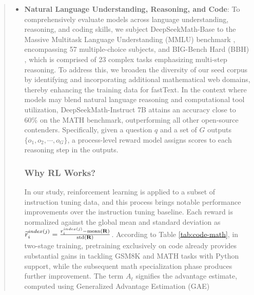 \begin{abstract}
\begin{itemize}[topsep=0pt]
This section details the procedure for curating the DeepSeekMath Corpus from the Common Crawl dataset. In this context, GSM8K and MATH with chain-of-thought responses serve as in-domain benchmarks, whereas all other datasets are categorized as out-of-domain. During training, examples are concatenated at random to approach a maximum context window of 4K tokens. The model undergoes training for 500 iterations, using a batch size of 256 and a fixed learning rate of 5e-5. For an in-depth account of the derivation, consult Appendix \ref{app:analysis-rl}. \subsection{Contributions}
This work makes advances in both large-scale mathematical pre-training and the systematic investigation of reinforcement learning techniques. The construction of this dataset leverages a fastText-based classifier \citep{joulin2016fasttext} to extract relevant data from the Common Crawl (CC). Results in Table \ref{tab:base_math_pot_proof} show that DeepSeekMath-Base 7B sets a new benchmark by exceeding the performance of the former leader, Llemma 34B. We hypothesize this could explain why RL here only boosts Maj@K scores. \item \textbf{Natural Language Understanding, Reasoning, and Code}: To comprehensively evaluate models across language understanding, reasoning, and coding skills, we subject DeepSeekMath-Base to the Massive Multitask Language Understanding (MMLU) benchmark \citep{mmlu}, encompassing 57 multiple-choice subjects, and BIG-Bench Hard (BBH) \citep{bbh}, which is comprised of 23 complex tasks emphasizing multi-step reasoning. To address this, we broaden the diversity of our seed corpus by identifying and incorporating additional mathematical web domains, thereby enhancing the training data for fastText. In the context where models may blend natural language reasoning and computational tool utilization, DeepSeekMath-Instruct 7B attains an accuracy close to 60\% on the MATH benchmark, outperforming all other open-source contenders. Specifically, given a question $q$ and a set of $G$ outputs $\{o_1, o_2, \cdots, o_G\}$, a process-level reward model assigns scores to each reasoning step in the outputs. \subsubsection{Why RL Works?} In our study, reinforcement learning is applied to a subset of instruction tuning data, and this process brings notable performance improvements over the instruction tuning baseline. Each reward is normalized against the global mean and standard deviation as $\widetilde{r}_i^{index(j)} = \frac{r_i^{index(j)} - {\rm mean(\mathbf{R})}}{{\rm std(\mathbf{R})}}$. According to Table \ref{tab:code-math}, in two-stage training, pretraining exclusively on code already provides substantial gains in tackling GSM8K and MATH tasks with Python support, while the subsequent math specialization phase produces further improvement. The term $A_t$ signifies the advantage estimate, computed using Generalized Advantage Estimation (GAE) 
\end{itemize}
\end{abstract}
